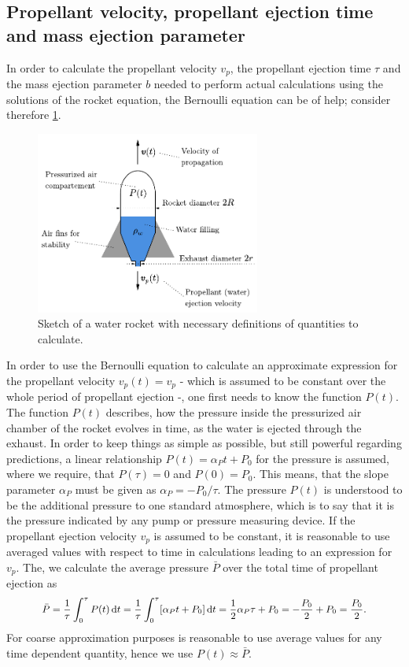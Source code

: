 \documentclass[a4paper,11pt]{report}
\begin{document}
\subsection{Propellant velocity, propellant ejection time and mass ejection parameter}
In order to calculate the propellant velocity $v_p$, the propellant ejection time $\tau$ and the mass ejection parameter $b$ needed to perform actual calculations using the solutions of the rocket equation, the Bernoulli equation can be of help; consider therefore \cref{fig:setupcalculations}.
\begin{figure}[h!]
\centering
\includegraphics[height=6cm]{figures/setupcalculations.pdf}
\caption{Sketch of a water rocket with necessary definitions of quantities to calculate.}
\label{fig:setupcalculations}
\end{figure}

In order to use the Bernoulli equation to calculate an approximate expression for the propellant velocity $v_p(t) = v_p$ - which is assumed to be constant over the whole period of propellant ejection -, one first needs to know the function $P(t)$. The function $P(t)$ describes, how the pressure inside the pressurized air chamber of the rocket evolves in time, as the water is ejected through the exhaust. In order to keep things as simple as possible, but still powerful regarding predictions, a linear relationship $P(t) = \alpha_P t + P_0$ for the pressure is assumed, where we require, that $P(\tau) = 0$ and $P(0) = P_0$. This means, that the slope parameter $\alpha_P$ must be given as $\alpha_P = -P_0/\tau$. The pressure $P(t)$ is understood to be the additional pressure to one standard atmosphere, which is to say that it is the pressure indicated by any pump or pressure measuring device. If the propellant ejection velocity $v_p$ is assumed to be constant, it is reasonable to use averaged values with respect to time in calculations leading to an expression for $v_p$. The, we calculate the average pressure $\bar{P}$ over the total time of propellant ejection as \begin{align}\small\begin{aligned}
\bar{P} = \frac{1}{\tau}\int_{0}^{\tau} P(t)\,\mathrm{d}t = \frac{1}{\tau}\int_{0}^{\tau} [\alpha_P t + P_0]\,\mathrm{d}t = \frac{1}{2}\alpha_P\tau + P_0 = -\frac{P_0}{2} + P_0 = \frac{P_0}{2}.
\end{aligned}\end{align} For coarse approximation purposes is reasonable to use average values for any time dependent quantity, hence we use $P(t) \approx \bar{P}$.
\end{document}
